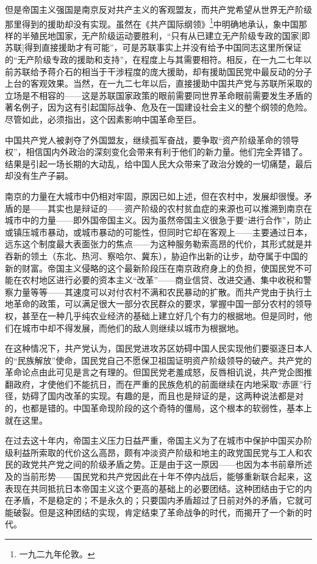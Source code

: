 \documentclass[10pt]{book}
\begin{document}
但是帝国主义强国是南京反对共产主义的客观盟友，而共产党希望从世界无产阶级那里得到的援助却没有实现。虽然在《共产国际纲领》\footnote{一九二九年伦敦。}中明确地承认，象中国那样的半殖民地国家，无产阶级运动要胜利，“只有从已建立无产阶级专政的国家[即苏联]得到直接援助才有可能”，可是苏联事实上并没有给予中国同志这里所保证的“无产阶级专政的援助和支持”，在程度上与其需要相符。相反，在一九二七年以前苏联给予蒋介石的相当于干涉程度的庞大援助，却有援助国民党中最反动的分子上台的客观效果。当然，在一九二七年以后，直接援助中国共产党与苏联所采取的立场是不相容的——这是苏联国家政策的眼前需要同世界革命眼前需要发生矛盾的著名例子，因为这有引起国际战争、危及在一国建设社会主义的整个纲领的危险。尽管如此，必须指出，这个因素影响中国革命至巨。

中国共产党人被剥夺了外国盟友，继续孤军奋战，要争取“资产阶级革命的领导权”，相信国内外政治的深刻变化会带来有利于他们的新力量。他们完全弄错了。结果是引起一场长期的大动乱，给中国人民大众带来了政治分娩的一切痛楚，最后却没有生产子嗣。

南京的力量在大城市中仍相对牢固，原因已如上述，但在农村中，发展却很慢。矛盾的是——其实也是辩证的——资产阶级的农村贫血症的来源也可以推溯到南京在城市中的力量——即外国帝国主义。因为虽然帝国主义很急于要“进行合作”，防止或镇压城市暴动，或城市暴动的可能性，但同时它却在客观上——主要通过日本，远东这个制度最大表面张力的焦点——为这种服务勒索高昂的代价，其形式就是并吞新的领土（东北、热河、察哈尔、冀东），胁迫作出新的让步，劫夺属于中国的新的财富。帝国主义侵略的这个最新阶段压在南京政府身上的负担，使国民党不可能在农村地区进行必要的资本主义“改革”——商业信贷、改进交通、集中收税和警察力量等等——其速度可以对付农村不满和农民暴动的扩散。而共产党由于执行土地革命的政策，可以满足很大一部分农民群众的要求，掌握中国一部分农村的领导权，甚至在一种几乎纯农业经济的基础上建立好几个有力的根据地。但是同时，他们在城市中却不得发展，而他们的敌人则继续以城市为根据地。

在这种情况下，共产党认为，国民党进攻苏区妨碍中国人民实现他们要驱逐日本人的“民族解放”使命，国民党自己不愿保卫祖国证明资产阶级领导的破产。共产党的革命论点由此可见是言之有理的。但国民党老羞成怒，反唇相讥说，共产党企图推翻政府，才使他们不能抗日，而在严重的民族危机的前面继续在内地采取“赤匪”行径，妨碍了国内改革的实现。有趣的是，而且也是辩证的是，这两种说法都是对的，也都是错的。中国革命现阶段的这个奇特的僵局，这个根本的软弱性，基本上就在这里。

在过去这十年内，帝国主义压力日益严重，帝国主义为了在城市中保护中国买办阶级利益所索取的代价这么高昂，颇有冲淡资产阶级和地主的政党国民党与工人和农民的政党共产党之间的阶级矛盾之势。正是由于这一原因——也因为本书前章所述及的当前形势——国民党和共产党因此在十年不停内战后，能够重新联合起来，这表现在共同抵抗日本帝国主义这个更高的基础上的必要团结。这种团结由于它的内在矛盾，不是稳定的；不是永久的；只要国内矛盾超过了日前对外的矛盾，它就可能破裂。但是这种团结的实现，肯定结束了革命战争的时代，而揭开了一个新的时代。
\end{document}
